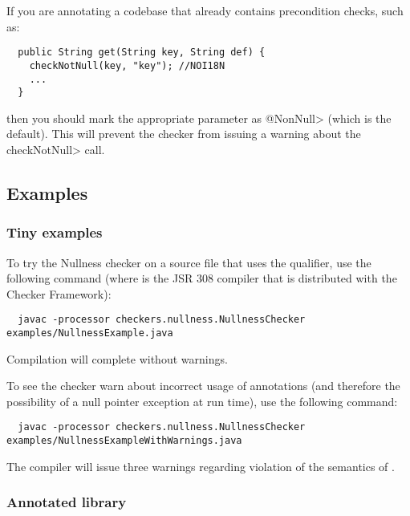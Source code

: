 If you are annotating a codebase that already contains precondition checks,
such as:

\begin{Verbatim}
  public String get(String key, String def) {
    checkNotNull(key, "key"); //NOI18N
    ...
  }
\end{Verbatim}

\noindent
then you should mark the appropriate parameter as \<@NonNull> (which is the
default).  This will prevent the checker from issuing a warning about the
\<checkNotNull> call.


\subsection{Examples\label{nullness-example}}

\subsubsection{Tiny examples\label{nullness-tiny-examples}}

To try the Nullness checker on a source file that uses the  qualifier,
use the following command (where  is the JSR 308 compiler that
is distributed with the Checker Framework):

\begin{Verbatim}
  javac -processor checkers.nullness.NullnessChecker examples/NullnessExample.java
\end{Verbatim}

\noindent
Compilation will complete without warnings.

To see the checker warn about incorrect usage of annotations (and therefore the
possibility of a null pointer exception at run time), use the following command:

\begin{Verbatim}
  javac -processor checkers.nullness.NullnessChecker examples/NullnessExampleWithWarnings.java
\end{Verbatim}

\noindent
The compiler will issue three warnings regarding violation of the semantics of
.


\subsubsection{Annotated library\label{nullness-annotated-library}}

